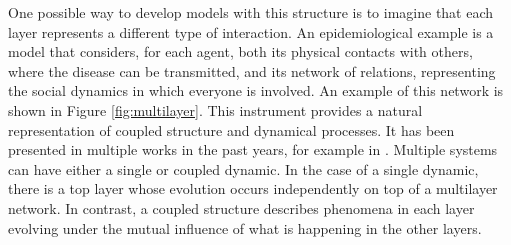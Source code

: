 One possible way to develop models with this structure is to imagine that each layer represents a different type of interaction. An epidemiological example is a model that considers, for each agent, both its physical contacts with others, where the disease can be transmitted, and its network of relations, representing the social dynamics in which everyone is involved. An example of this network is shown in Figure \ref{fig:multilayer}. This instrument provides a natural representation of coupled structure and dynamical processes. It has been presented in multiple works in the past years, for example in \cite{Wang_2019}. 
Multiple systems can have either a single or coupled dynamic. In the case of a single dynamic, there is a top layer whose evolution occurs independently on top of a multilayer network. In contrast, a coupled structure describes phenomena in each layer evolving under the mutual influence of what is happening in the other layers.


